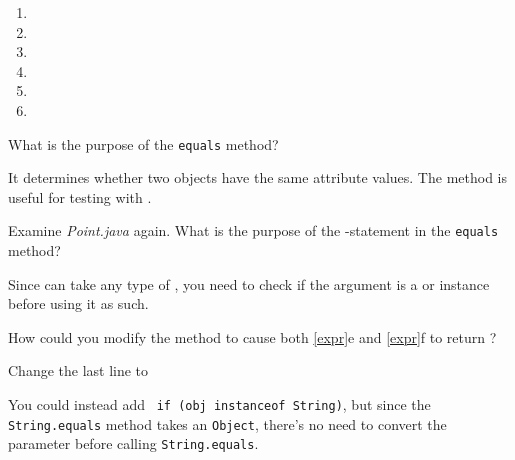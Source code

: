 \begin{multicols}{2}
\setlength{\defaultwidth}{5em}
\begin{enumerate}[itemsep=1pt]
\item {} 
\item {} 
\item {} 
\item {} 
\item {} 
\item {} 
\end{enumerate}
\end{multicols}


\Q \label{key2}
What is the purpose of the \texttt{equals} method?

\begin{answer}
It determines whether two objects have the same attribute values.
The  method is useful for testing with .
\end{answer}


\Q Examine {\it Point.java} again.
What is the purpose of the -statement in the \texttt{equals} method?

\begin{answer}
Since  can take any type of , you need to check if the argument is a  or  instance before using it as such.
\end{answer}


\Q How could you modify the  method to cause both \ref{expr}e and \ref{expr}f to return ?

\begin{answer}[5em]
Change the last line to ~

\vspace{1em}
You could instead add ~\texttt{if (obj instanceof String)}, but since the \texttt{String.equals} method takes an \texttt{Object}, there's no need to convert the  parameter before calling \texttt{String.equals}.
\end{answer}

